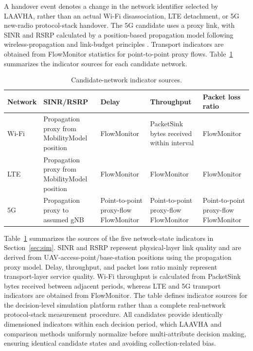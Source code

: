 \documentclass[final,3p,times,twocolumn]{elsarticle}
\begin{document}
A handover event denotes a change in the network identifier selected by LAAVHA, rather than an actual Wi-Fi disassociation, LTE detachment, or 5G new-radio protocol-stack handover. The 5G candidate uses a proxy link, with SINR and RSRP calculated by a position-based propagation model following wireless-propagation and link-budget principles \cite{ref34}. Transport indicators are obtained from FlowMonitor statistics for point-to-point proxy flows. Table~\ref{tab:metrics} summarizes the indicator sources for each candidate network.

\begin{table}[H]
\centering
\caption{Candidate-network indicator sources.}
\small
\begin{tabularx}{\textwidth}{>{\raggedright\arraybackslash}p{1.3cm}>{\raggedright\arraybackslash}X>{\raggedright\arraybackslash}X>{\raggedright\arraybackslash}X>{\raggedright\arraybackslash}X}
\toprule
\textbf{Network} & \textbf{SINR/RSRP} & \textbf{Delay} & \textbf{Throughput} & \textbf{Packet loss ratio} \\
\midrule
Wi-Fi & Propagation proxy from MobilityModel position & FlowMonitor & PacketSink bytes received within interval & FlowMonitor \\
LTE & Propagation proxy from MobilityModel position & FlowMonitor & FlowMonitor & FlowMonitor \\
5G & Propagation proxy to assumed gNB & Point-to-point proxy-flow FlowMonitor & Point-to-point proxy-flow FlowMonitor & Point-to-point proxy-flow FlowMonitor \\
\bottomrule
\end{tabularx}
\label{tab:metrics}
\end{table}

Table~\ref{tab:metrics} summarizes the sources of the five network-state indicators in Section~\ref{sec:sim}. SINR and RSRP represent physical-layer link quality and are derived from UAV-access-point/base-station positions using the propagation proxy model. Delay, throughput, and packet loss ratio mainly represent transport-layer service quality. Wi-Fi throughput is calculated from PacketSink bytes received between adjacent periods, whereas LTE and 5G transport indicators are obtained from FlowMonitor. The table defines indicator sources for the decision-level simulation platform rather than a complete real-network protocol-stack measurement procedure. All candidates provide identically dimensioned indicators within each decision period, which LAAVHA and comparison methods uniformly normalize before multi-attribute decision making, ensuring identical candidate states and avoiding collection-related bias.
\end{document}
